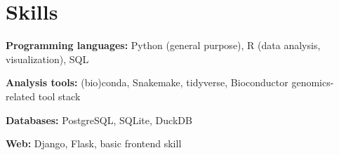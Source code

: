 \section{Skills}
\begin{compactentrylist}

\item \textbf{Programming languages:}
    Python (general purpose),
    R (data analysis, visualization),
    SQL

\item \textbf{Analysis tools:} (bio)conda, Snakemake, tidyverse, Bioconductor genomics-related tool stack

\item \textbf{Databases:} PostgreSQL, SQLite, DuckDB

\item \textbf{Web:} Django, Flask, basic frontend skill

\end{compactentrylist}
